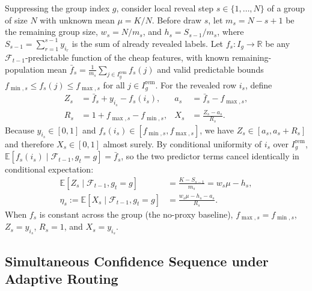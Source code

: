 Suppressing the group index $g$, consider local reveal step $s \in \{1, \dots, N\}$ of a group of size $N$ with unknown mean $\mu = K/N$.
Before draw $s$, let $m_s = N - s + 1$ be the remaining group size, $w_s = N / m_s$, and $h_s = S_{s-1} / m_s$, where $S_{s-1} = \sum_{r=1}^{s-1} y_{i_r}$ is the sum of already revealed labels.
Let $f_s : I_g \to \mathbb{R}$ be any $\mathcal{F}_{t-1}$-predictable function of the cheap features, with known remaining-population mean $\bar{f}_s = \frac{1}{m_s}\sum_{j \in I_g^{\text{rem}}} f_s(j)$ and valid predictable bounds $f_{\min,s} \le f_s(j) \le f_{\max,s}$ for all $j \in I_g^{\text{rem}}$.
For the revealed row $i_s$, define
\begin{align}
  Z_s &= \bar{f}_s + y_{i_s} - f_s(i_s), &
  a_s &= \bar{f}_s - f_{\max,s}, \label{eq:z-def}\\
  R_s &= 1 + f_{\max,s} - f_{\min,s}, &
  X_s &= \frac{Z_s - a_s}{R_s}. \label{eq:x-def}
\end{align}
Because $y_{i_s} \in [0, 1]$ and $f_s(i_s) \in [f_{\min,s}, f_{\max,s}]$, we have $Z_s \in [a_s, a_s + R_s]$ and therefore $X_s \in [0, 1]$ almost surely.
By conditional uniformity of $i_s$ over $I_g^{\text{rem}}$, $\mathbb{E}[f_s(i_s) \mid \mathcal{F}_{t-1}, g_t = g] = \bar{f}_s$, so the two predictor terms cancel identically in conditional expectation:
\begin{align}
  \mathbb{E}[Z_s \mid \mathcal{F}_{t-1}, g_t = g] &= \frac{K - S_{s-1}}{m_s} = w_s \mu - h_s, \nonumber\\
  \eta_s := \mathbb{E}[X_s \mid \mathcal{F}_{t-1}, g_t = g] &= \frac{w_s \mu - h_s - a_s}{R_s}.
  \label{eq:cond-mean}
\end{align}
When $f_s$ is constant across the group (the no-proxy baseline), $f_{\max,s} = f_{\min,s}$, $Z_s = y_{i_s}$, $R_s = 1$, and $X_s = y_{i_s}$.

\subsection{Simultaneous Confidence Sequence under Adaptive Routing}
\label{sec:cs-theorem}

